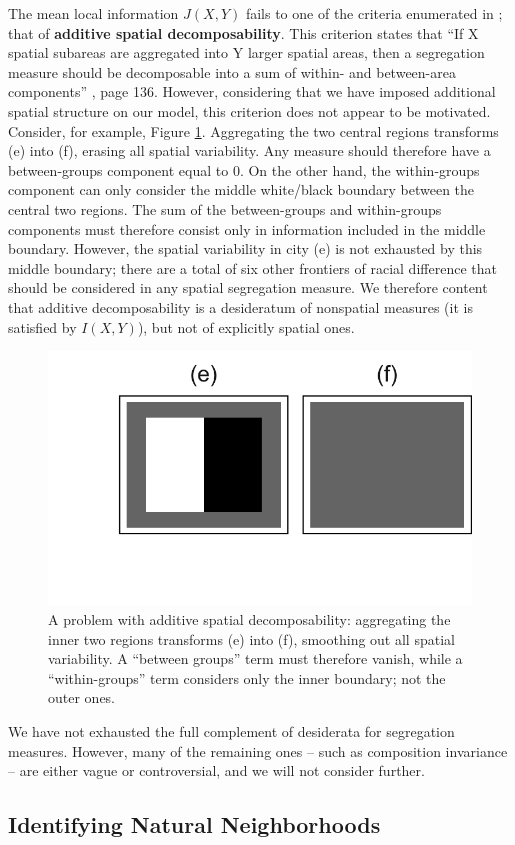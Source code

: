 	The mean local information $J(X,Y)$ fails to one of the criteria enumerated in \cite{Reardon2002,Reardon2004}; that of \textbf{additive spatial decomposability}. This criterion states that ``If X spatial subareas are aggregated into Y larger spatial areas, then a segregation measure should be decomposable into a sum of within- and between-area components'' \cite{Reardon2004}, page 136. However, considering that we have imposed additional spatial structure on our model, this criterion does not appear to be motivated. Consider, for example, Figure \ref{fig:decomposability}. Aggregating the two central regions transforms (e) into (f), erasing all spatial variability. Any measure should therefore have a between-groups component equal to 0. On the other hand, the within-groups component can only consider the middle white/black boundary between the central two regions. The sum of the between-groups and within-groups components must therefore consist only in information included in the middle boundary. However, the spatial variability in city (e) is not exhausted by this middle boundary; there are a total of six other frontiers of racial difference that should be considered in any spatial segregation measure. We therefore content that additive decomposability is a desideratum of nonspatial measures (it is satisfied by $I(X,Y)$), but not of explicitly spatial ones. 
	\begin{figure}
		\centering
		\includegraphics[width=.5\textwidth]{figs/decomposability.png}
		\caption{A problem with additive spatial decomposability: aggregating the inner two regions transforms (e) into (f), smoothing out all spatial variability. A ``between groups'' term must therefore vanish, while a ``within-groups'' term considers only the inner boundary; not the outer ones.}
		\label{fig:decomposability}
	\end{figure}
	We have not exhausted the full complement of desiderata for segregation measures. However, many of the remaining ones -- such as composition invariance -- are either vague or controversial, and we will not consider further. 

\subsection{Identifying Natural Neighborhoods}
	
